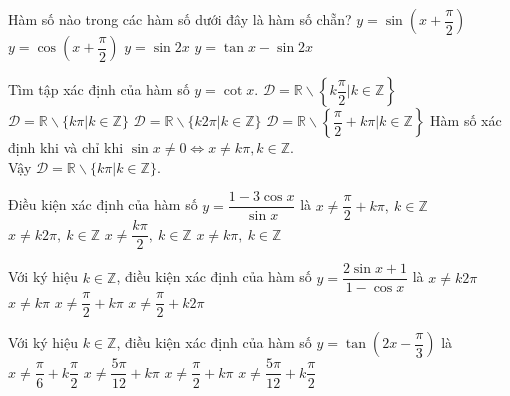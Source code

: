 \begin{ex}%
	Hàm số nào trong các hàm số dưới đây là hàm số chẵn?
	\choice
	{\True $y=\sin\left(x+\dfrac{\pi}{2}\right)$}
	{$y=\cos\left(x+\dfrac{\pi}{2}\right)$}
	{$y=\sin 2x$}
	{$y=\tan x-\sin 2x$}
\end{ex}

\begin{ex}%
	Tìm tập xác định của hàm số $ y = \cot x $.
	\choice
	{$ \mathscr D = \mathbb{R} \backslash \left\lbrace k\dfrac{\pi}{2} | k \in \mathbb{Z} \right\rbrace $}
	{\True $ \mathscr D = \mathbb{R} \backslash \{k\pi | k \in \mathbb{Z} \} $}
	{$ \mathscr D = \mathbb{R} \backslash \{k2\pi | k \in \mathbb{Z} \} $}
	{$ \mathscr D = \mathbb{R} \backslash \left\lbrace\dfrac{\pi}{2} + k \pi  | k \in \mathbb{Z} \right\rbrace $}
	\loigiai
	{
		Hàm số xác định khi và chỉ khi $\sin x \ne 0 \Leftrightarrow x \ne k \pi, k \in \mathbb{Z}.$\\
		Vậy $ \mathscr D = \mathbb{R} \backslash \{k\pi | k \in \mathbb{Z} \} $.
	}
\end{ex}

\begin{ex}%
	Điều kiện xác định của hàm số $y=\dfrac{1-3\cos x}{\sin x}$ là
	\choice
	{$x\ne \dfrac{\pi}{2}+k\pi,~k\in\mathbb{Z}$}
	{$x\ne k2\pi,~k\in\mathbb{Z}$}
	{$x\ne \dfrac{k\pi}{2},~k\in\mathbb{Z}$}
	{\True $x\ne k\pi,~k\in\mathbb{Z}$}
\end{ex}

\begin{ex}%
	Với ký hiệu $k\in \mathbb{Z}$, điều kiện xác định của hàm số $y=\dfrac{2\sin x+1}{1-\cos x}$ là
	\choice
	{\True $x\ne k2\pi $}
	{$x\ne k\pi $}
	{$x\ne \dfrac{\pi}{2}+k\pi $}
	{$x\ne \dfrac{\pi}{2}+k2\pi $}
\end{ex}
\begin{ex}%
	Với ký hiệu $k \in \mathbb{Z}$, điều kiện xác định của hàm số $y=\tan \left(2x-\dfrac{\pi}{3}\right)$ là
	\choice
	{$x\ne \dfrac{\pi}{6}+k\dfrac{\pi}{2}$}
	{$x\ne \dfrac{5\pi}{12}+k\pi $}
	{$x\ne \dfrac{\pi}{2}+k\pi $}
	{\True $x\ne \dfrac{5\pi}{12}+k\dfrac{\pi}{2}$}
\end{ex}

